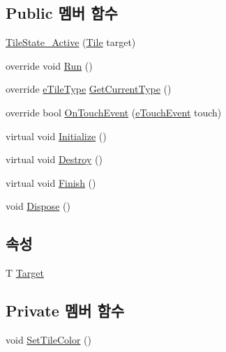 \subsection*{Public 멤버 함수}
\begin{DoxyCompactItemize}
\item 
\hyperlink{class_tile_1_1_tile_state___active_a89b45a1d74fe0e384f9cc8960f29d86a}{Tile\+State\+\_\+\+Active} (\hyperlink{class_tile}{Tile} target)
\item 
override void \hyperlink{class_tile_1_1_tile_state___active_ab53c7c818d65122d6d36c9681ca53bf9}{Run} ()
\item 
override \hyperlink{_tile_8cs_a271bc07be325bca511bcb747e0ff2fda}{e\+Tile\+Type} \hyperlink{class_tile_1_1_tile_state___active_afdc52754ce22e231c691a52d213dd92d}{Get\+Current\+Type} ()
\item 
override bool \hyperlink{class_tile_1_1_tile_state___active_a7a9e2832931f69884ee0d9917ab619a8}{On\+Touch\+Event} (\hyperlink{_touch_manager_8cs_ae33e321a424fe84ba8b2fdb81ad40a68}{e\+Touch\+Event} touch)
\item 
virtual void \hyperlink{class_m_c_n_1_1_state_a8eabaffe047e6dccd5c5d8aed7bf218a}{Initialize} ()
\item 
virtual void \hyperlink{class_m_c_n_1_1_state_a32af22a6a0a979d3b3a80225426aa839}{Destroy} ()
\item 
virtual void \hyperlink{class_m_c_n_1_1_state_a6de4f94b23916fcd05f589759da9ac3f}{Finish} ()
\item 
void \hyperlink{class_m_c_n_1_1_state_a6c53b2eda47e718ff469fd76a95cf02a}{Dispose} ()
\end{DoxyCompactItemize}
\subsection*{속성}
\begin{DoxyCompactItemize}
\item 
T \hyperlink{class_m_c_n_1_1_state_a93ba2fd920292031bd6e65b1dc505cb3}{Target}
\end{DoxyCompactItemize}
\subsection*{Private 멤버 함수}
\begin{DoxyCompactItemize}
\item 
void \hyperlink{class_tile_1_1_tile_state___active_a89a5859b28fa5ad021e8dcee572aacc9}{Set\+Tile\+Color} ()
\end{DoxyCompactItemize}


